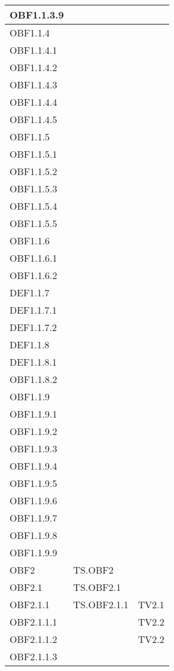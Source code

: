 \documentclass{scalatekids-article}
\begin{document}
\begin{longtable}[H]{|l|p{4cm}|p{4cm}|}
  \hline
  OBF1.1.3.9 &  &\\
  \hline
  OBF1.1.4 &  &\\
  \hline
  OBF1.1.4.1 &  &\\
  \hline
  OBF1.1.4.2 &  &\\
  \hline
  OBF1.1.4.3 &  &\\
  \hline
  OBF1.1.4.4 &  &\\
  \hline
  OBF1.1.4.5 &  &\\
  \hline
  OBF1.1.5 &  &\\
  \hline
  OBF1.1.5.1 &  &\\
  \hline
  OBF1.1.5.2 &  &\\
  \hline
  OBF1.1.5.3 &  &\\
  \hline
  OBF1.1.5.4 &  &\\
  \hline
  OBF1.1.5.5 &  &\\
  \hline
  OBF1.1.6 & &\\
  \hline
  OBF1.1.6.1 &  &\\
  \hline
  OBF1.1.6.2 &  &\\
  \hline
  DEF1.1.7 & &\\
  \hline
  DEF1.1.7.1 & &\\
  \hline
  DEF1.1.7.2 & &\\
  \hline
  DEF1.1.8 & &\\
  \hline
  DEF1.1.8.1 & &\\
  \hline
  OBF1.1.8.2 &  &\\
  \hline
  OBF1.1.9 &  &\\
  \hline
  OBF1.1.9.1 &  &\\
  \hline
  OBF1.1.9.2 &  &\\
  \hline
  OBF1.1.9.3 &  &\\
  \hline
  OBF1.1.9.4 &  &\\
  \hline
  OBF1.1.9.5 &  &\\
  \hline
  OBF1.1.9.6 &  &\\
  \hline
  OBF1.1.9.7 &  &\\
  \hline
  OBF1.1.9.8 &  &\\
  \hline
  OBF1.1.9.9 &  &\\
  \hline
  OBF2 & TS.OBF2 & \\
  \hline
  OBF2.1 & TS.OBF2.1 &\\
  \hline
  OBF2.1.1 & TS.OBF2.1.1 & TV2.1\\
  \hline
  OBF2.1.1.1 & & TV2.2\\
  \hline
  OBF2.1.1.2 & & TV2.2\\
  \hline
  OBF2.1.1.3 & & \\

\end{longtable}
\end{document}
